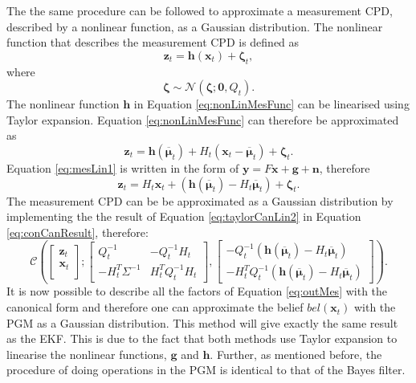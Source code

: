 \documentclass[12pt,oneside,openany,a4paper, %
afrikaans,english,
]{memoir}
\numberwithin{equation}{chapter}
\begin{document}
The the same procedure can be followed to approximate a measurement CPD, described by a nonlinear function, as a Gaussian distribution. The nonlinear function that describes the measurement CPD is defined as
\begin{equation}\label{eq:nonLinMesFunc}
\bm{z}_t = \bm{h}(\bm{x}_t) + \bm{\zeta}_t,
\end{equation}
where
\begin{equation}
\bm{\zeta} \sim \mathcal{N}(\bm{\zeta}; \bm{0}, Q_t).
\end{equation}
The nonlinear function $\bm{h}$ in Equation \ref{eq:nonLinMesFunc} can be linearised using Taylor expansion. Equation \ref{eq:nonLinMesFunc} can therefore be approximated as
\begin{equation}\label{eq:mesLin1}
\bm{z}_t = \bm{h}(\bm{\overline{\mu}}_t) + H_t(\bm{x}_{t} - 
\bm{\overline{\mu}}_{t}) + \bm{\zeta}_t.
\end{equation}
Equation \ref{eq:mesLin1} is written in the form of $\bm{y} = F\bm{x} + \bm{g} + \bm{n}$, therefore
\begin{equation}\label{eq:mesLin2}
\bm{z}_t = H_t\bm{x}_{t} + (\bm{h}(\bm{\overline{\mu}}_t) - H_t\bm{\overline{\mu}}_{t}) + \bm{\zeta}_t.
\end{equation}
The measurement CPD can be be approximated as a Gaussian distribution by implementing the the result of Equation \ref{eq:taylorCanLin2} in Equation \ref{eq:conCanResult}, therefore:
\begin{equation}
\mathcal{C}\left(
\begin{bmatrix}
\bm{z}_t \\
\bm{x}_{t} \\
\end{bmatrix};
\begin{bmatrix}
Q_t^{-1}  &  -Q_t^{-1}H_t\\
-H_t^T\Sigma^{-1} & H_t^T Q_t^{-1}H_t
\end{bmatrix}
, 
\begin{bmatrix}
-Q_t^{-1}(\bm{h}(\bm{\overline{\mu}}_t) - H_t\bm{\overline{\mu}}_{t})\\
-H_t^T Q_t^{-1}(\bm{h}(\bm{\overline{\mu}}_t) - H_t\bm{\overline{\mu}}_{t})
\end{bmatrix}
\right).
\end{equation}
It is now possible to describe all the factors of Equation \ref{eq:outMes} with the canonical form and therefore one can approximate the belief $bel(\bm{x}_t)$ with the PGM as a Gaussian distribution. This method will give exactly the same result as the EKF. This is due to the fact that both methods use Taylor expansion to linearise the nonlinear functions, $\bm{g}$ and $\bm{h}$. Further, as mentioned before, the procedure of doing operations in the PGM is identical to that of the Bayes filter.
\end{document}
